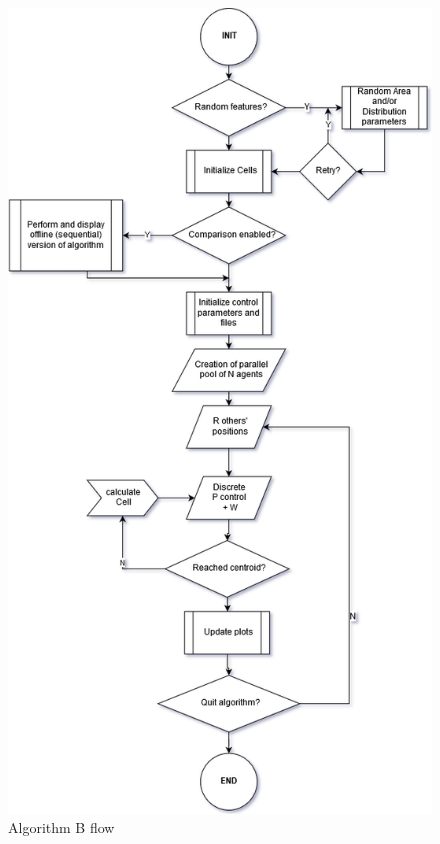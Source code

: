 \documentclass[a4paper,11pt,oneside]{book}
\begin{document}
	
	\begin{figure}[H]
		
		\centering
		
		\includegraphics[scale=0.55]{figs/algorithmB.png}
		
		\caption{Algorithm B flow}\label{fig:algorithmB.png}
		
	\end{figure}
	
\end{document}

